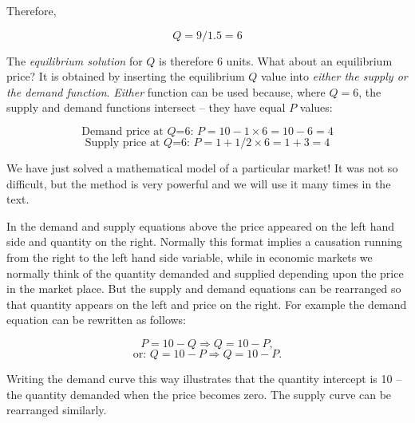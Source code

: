Therefore,

\begin{equation*}
Q=9/1.5=6
\end{equation*}

The \textit{equilibrium solution} for $Q$ is therefore 6 units. What about an equilibrium price? It is obtained by inserting the equilibrium $Q$ value into \textit{either the supply or the demand function}. \textit{Either} function can be used because, where $Q=6$, the supply and demand functions intersect -- they have equal $P$ values:

\begin{equation*}
\text{Demand price at $Q$=6: }P=10-1\times 6 =10-6=4
\end{equation*}
\begin{equation*}
\text{Supply price at $Q$=6: }P=1+1/2\times 6=1+3=4
\end{equation*}

We have just solved a mathematical model of a particular market! It was not so difficult, but the method is very powerful and we will use it many times in the text.

In the demand and supply equations above the price appeared on the left hand side and quantity on the right. Normally this format implies a causation running from the right to the left hand side variable, while in economic markets we normally think of the quantity demanded and supplied depending upon the price in the market place. But the supply and demand equations can be rearranged so that quantity appears on the left and price on the right. For example the demand equation can be rewritten as follows:

\begin{equation*}
P=10-Q\Rightarrow  Q=10-P,
\end{equation*}
\begin{equation*}
\text{or: }Q=10-P\Rightarrow Q=10-P.
\end{equation*}

Writing the demand curve this way illustrates that the quantity intercept is 10 -- the quantity demanded when the price becomes zero. The supply curve can be rearranged similarly.